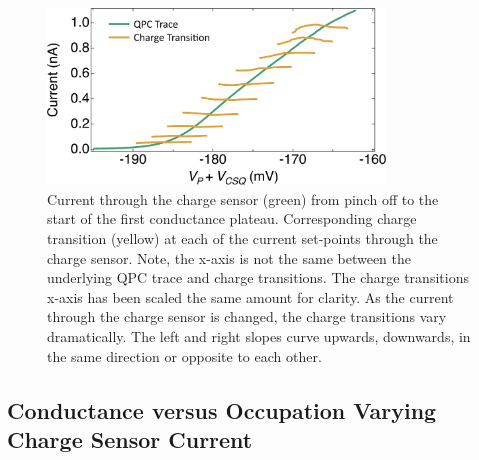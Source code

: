 \begin{figure}[!bht]
  \begin{center}
    \includegraphics[width=0.8\textwidth]{figures/ch3/crop_FiguresMaster.016.png}
    \caption[Charge transitions measured at various current set points through the charge sensor]{\label{fig:ch3/cond_occ_ct_set-points} 
    Current through the charge sensor (green) from pinch off to the start of the first conductance plateau. Corresponding charge transition (yellow) at each of the current set-points through the charge sensor. Note, the x-axis is not the same between the underlying QPC trace and charge transitions. The charge transitions x-axis has been scaled the same amount for clarity. As the current through the charge sensor is changed, the charge transitions vary dramatically. The left and right slopes curve upwards, downwards, in the same direction or opposite to each other.}
  \end{center}
\end{figure}



\subsection{Conductance versus Occupation Varying Charge Sensor Current}

